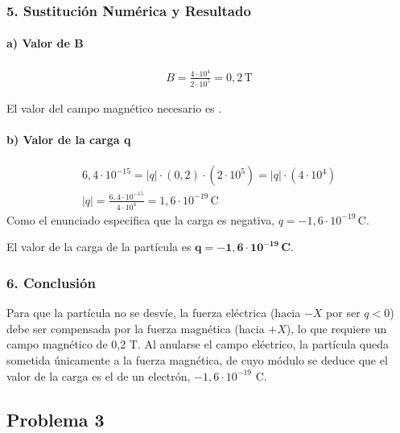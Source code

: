 \subsubsection*{5. Sustitución Numérica y Resultado}
\paragraph*{a) Valor de B}
\begin{gather}
    B = \frac{4 \cdot 10^4}{2 \cdot 10^5} = 0,2 \, \text{T}
\end{gather}
\begin{cajaresultado}
    El valor del campo magnético necesario es .
\end{cajaresultado}
\paragraph*{b) Valor de la carga q}
\begin{gather}
    6,4 \cdot 10^{-15} = |q| \cdot (0,2) \cdot (2 \cdot 10^5) = |q| \cdot (4 \cdot 10^4) \\
    |q| = \frac{6,4 \cdot 10^{-15}}{4 \cdot 10^4} = 1,6 \cdot 10^{-19} \, \text{C}
\end{gather}
Como el enunciado especifica que la carga es negativa, $q = -1,6 \cdot 10^{-19} \, \text{C}$.
\begin{cajaresultado}
    El valor de la carga de la partícula es $\boldsymbol{q = -1,6 \cdot 10^{-19} \, \textbf{C}}$.
\end{cajaresultado}

\subsubsection*{6. Conclusión}
\begin{cajaconclusion}
Para que la partícula no se desvíe, la fuerza eléctrica (hacia $-X$ por ser $q<0$) debe ser compensada por la fuerza magnética (hacia $+X$), lo que requiere un campo magnético de 0,2 T. Al anularse el campo eléctrico, la partícula queda sometida únicamente a la fuerza magnética, de cuyo módulo se deduce que el valor de la carga es el de un electrón, $-1,6 \cdot 10^{-19}$ C.
\end{cajaconclusion}
\newpage
\subsection{Problema 3}
\label{subsec:P3_2021_jul_ext}

